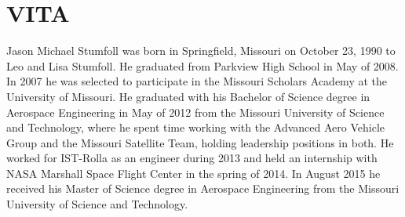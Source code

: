 \clearpage
\chapter*{VITA}

Jason Michael Stumfoll was born in Springfield, Missouri on October 23, 1990 to
Leo and Lisa Stumfoll. He graduated from Parkview High School in May of 2008. In
2007 he was selected to participate in the Missouri Scholars Academy at the
University of Missouri. He graduated with his Bachelor of Science degree in
Aerospace Engineering in May of 2012 from the Missouri University of Science and
Technology, where he spent time working with the Advanced Aero Vehicle Group and
the Missouri Satellite Team, holding leadership positions in both. He worked for
IST-Rolla as an engineer during 2013 and held an internship with NASA Marshall
Space Flight Center in the spring of 2014. In August 2015 he received his Master
of Science degree in Aerospace Engineering from the Missouri University of
Science and Technology.
